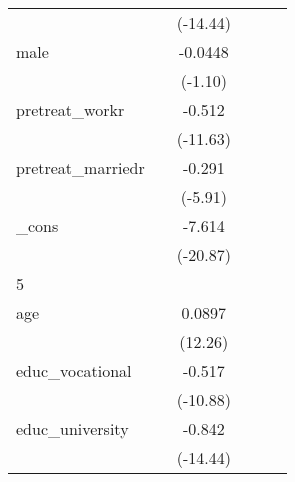 {\begin{tabular}{l*{5}{c}}
            &                     &    (-14.44)         &                     &                     &                     \\
[1em]
male        &                     &     -0.0448         &                     &                     &                     \\
            &                     &     (-1.10)         &                     &                     &                     \\
[1em]
pretreat\_workr&                     &      -0.512\sym{***}&                     &                     &                     \\
            &                     &    (-11.63)         &                     &                     &                     \\
[1em]
pretreat\_marriedr&                     &      -0.291\sym{***}&                     &                     &                     \\
            &                     &     (-5.91)         &                     &                     &                     \\
[1em]
\_cons      &                     &      -7.614\sym{***}&                     &                     &                     \\
            &                     &    (-20.87)         &                     &                     &                     \\
\hline
5           &                     &                     &                     &                     &                     \\
age         &                     &      0.0897\sym{***}&                     &                     &                     \\
            &                     &     (12.26)         &                     &                     &                     \\
[1em]
educ\_vocational&                     &      -0.517\sym{***}&                     &                     &                     \\
            &                     &    (-10.88)         &                     &                     &                     \\
[1em]
educ\_university&                     &      -0.842\sym{***}&                     &                     &                     \\
            &                     &    (-14.44)         &                     &                     &                     \\

\end{tabular}}
